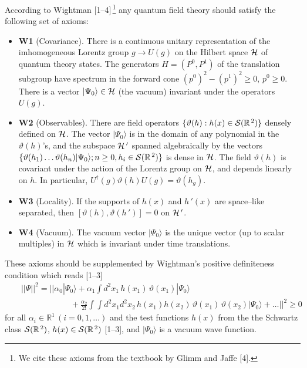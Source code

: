 \documentclass[a4paper,12pt] {article}
\begin{document}
\hspace{0.2in} According to Wightman [1--4]\,\footnote{We cite these
axioms from the textbook by Glimm and Jaffe [4].} any quantum field
theory should satisfy the following set of axioms:
\begin{itemize}
\item {\bf W1} (Covariance). There is a continuous unitary
representation of the imhomogeneous Lorentz group $g \to U(g)$ on the
Hilbert space ${\cal H}$ of quantum theory states. The generators $H =
(P^0, P^1)$ of the translation subgroup have spectrum in the forward
cone $(p^0)^2 - (p^1)^2 \ge 0,\,p^0 \ge 0$. There is a vector
$|\Psi_0\rangle \in {\cal H}$ (the vacuum) invariant under the
operators $U(g)$.

\item {\bf W2} (Observables). There are field operators
$\{\vartheta(h): h(x) \in {\cal S}(\mathbb{R}^{\,2})\}$ densely
defined on ${\cal H}$. The vector $|\Psi_0\rangle$ is in the domain of
any polynomial in the $\vartheta(h)$'s, and the subspace ${\cal H}\,'$
spanned algebraically by the vectors $\{\vartheta(h_1)\ldots
\vartheta(h_n)|\Psi_0\rangle ; n \ge 0, h_i \in {\cal
S}(\mathbb{R}^{\,2})\}$ is dense in ${\cal H}$. The field
$\vartheta(h)$ is covariant under the action of the Lorentz group on
${\cal H}$, and depends linearly on $h$. In particular,
$U^{\dagger}(g) \vartheta(h)U(g) = \vartheta(h_g)$.

\item {\bf W3} (Locality). If the supports of $h(x)$ and
$h\,'(x)$ are space--like separated, then
$[\vartheta(h),\vartheta(h\,')] = 0$ on ${\cal H}\,'$.

\item {\bf W4} (Vacuum). The vacuum vector $|\Psi_0\rangle$ is the
unique vector (up to scalar multiples) in ${\cal H}$ which is
invariant under time translations.
\end{itemize}

These axioms should be supplemented by Wightman's positive
definiteness condition which reads [1--3]
%
\begin{eqnarray}\label{label2.1}
&&|\!|\Psi|\!|^2 = \Big|\!\Big| \alpha_0|\Psi_0\rangle + \alpha_1\int
d^2x_1\,h(x_1)\,\vartheta(x_1)|\Psi_0\rangle \nonumber\\
&&\hspace{1in} + \frac{\alpha_2}{2!}\int\!\!\!\int
d^2x_1d^2x_2\,h(x_1)
h(x_2)\,\vartheta(x_1)\,\vartheta(x_2)|\Psi_0\rangle +
\ldots\Big|\!\Big|^2 \ge 0
\end{eqnarray}
%
for all $\alpha_i\in \mathbb{R}^1\,(i=0,1,\ldots)$ and the test
functions $h(x)$ from the the Schwartz class ${\cal
S}(\mathbb{R}^{\,2})$, $h(x) \in {\cal S}(\mathbb{R}^{\,2})$ [1--3],
and $|\Psi_0\rangle$ is a vacuum wave function.
\end{document}
